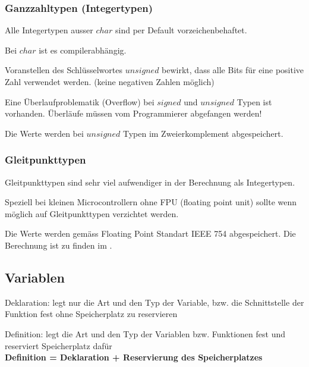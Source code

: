 		\subsubsection{Ganzzahltypen (Integertypen) }
			\begin{compactitem}
				\item Alle Integertypen ausser $char$ sind per Default vorzeichenbehaftet.
				\item Bei $char$ ist es compilerabhängig.
				\item Voranstellen des Schlüsselwortes $unsigned$ bewirkt, dass alle Bits für eine positive Zahl verwendet werden. (keine negativen Zahlen möglich)
				\item Eine Überlaufproblematik (Overflow) bei $signed$ und $unsigned$ Typen ist vorhanden. Überläufe müssen vom Programmierer abgefangen werden!
				\item Die Werte werden bei $unsigned$ Typen im Zweierkomplement abgespeichert.
			\end{compactitem}
			
		\subsubsection{Gleitpunkttypen }
			\begin{compactitem}
				\item Gleitpunkttypen sind sehr viel aufwendiger in der Berechnung als Integertypen.
				\item Speziell bei kleinen Microcontrollern ohne FPU (floating point unit) sollte wenn möglich auf Gleitpunkttypen verzichtet werden.
				\item Die Werte werden gemäss Floating Point Standart IEEE 754 abgespeichert. Die Berechnung ist zu finden im .
			\end{compactitem}
			
	\subsection{Variablen \verweis{5.3}}
		\begin{compactitem}
			\item Deklaration: legt nur die Art und den Typ der Variable, bzw. die Schnittstelle der Funktion fest ohne Speicherplatz zu reservieren
			\item Definition: legt die Art und den Typ der Variablen bzw. Funktionen fest und reserviert Speicherplatz dafür \\
			\textbf{Definition = Deklaration + Reservierung des Speicherplatzes} 
		\end{compactitem}
		
